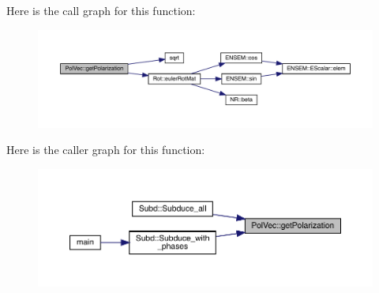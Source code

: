 Here is the call graph for this function\+:\nopagebreak
\begin{figure}[H]
\begin{center}
\leavevmode
\includegraphics[width=350pt]{d7/d0c/namespacePolVec_a068ffc885b3c06caa2c662b8887c0891_cgraph}
\end{center}
\end{figure}
Here is the caller graph for this function\+:
\nopagebreak
\begin{figure}[H]
\begin{center}
\leavevmode
\includegraphics[width=350pt]{d7/d0c/namespacePolVec_a068ffc885b3c06caa2c662b8887c0891_icgraph}
\end{center}
\end{figure}
